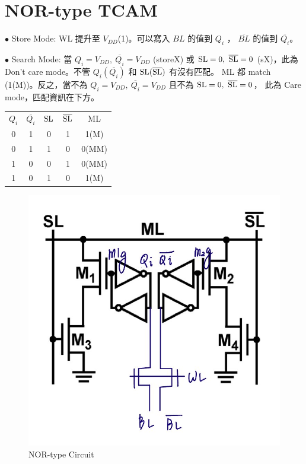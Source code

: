 \documentclass{article}
\begin{document}
\clearpage

\section{NOR-type TCAM}

$\bullet$ Store Mode: WL 提升至 $V_{DD}$(1)。可以寫入 $BL$ 的值到 $Q_i$ ， $\overline{BL}$ 的值到 $\overline{Q_i}$。

$\bullet$ Search Mode: 當 $Q_i = V_{DD},\ \overline{Q_i} = V_{DD}$ (storeX) 或 $\rm SL = 0,\ \overline{SL} = 0$ (sX)，此為 Don't care mode。不管 $Q_i(\overline{Q_i})$ 和 $\rm SL(\overline{SL})$ 有沒有匹配。 ML 都 match (1(M))。反之，當不為 $Q_i = V_{DD},\ \overline{Q_i} = V_{DD}$ 且不為 $\rm SL = 0,\ \overline{SL} = 0$， 此為 Care mode，匹配資訊在下方。


\begin{table}[H]
  \centering
  \begin{tabular}{ccccc}
  $Q_i$ & $\overline{Q_i}$& $\rm SL$ & $\rm \overline{SL}$ & ML \\
  0  & 1     & 0  & 1     & 1(M) \\
  0  & 1     & 1  & 0     & 0(MM) \\
  1  & 0     & 0  & 1     & 0(MM) \\
  1  & 0     & 1  & 0     & 1(M) \\

  \end{tabular}
  \end{table}

  \begin{figure}[H]
    \centering
    \includegraphics[width=0.7\linewidth]{./img/2023-12-14-00-36-36.png}
    \caption{NOR-type Circuit}
    \end{figure}
\end{document}
